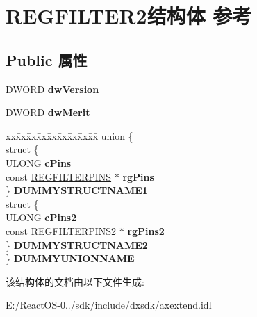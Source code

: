 \hypertarget{struct_r_e_g_f_i_l_t_e_r2}{}\section{R\+E\+G\+F\+I\+L\+T\+E\+R2结构体 参考}
\label{struct_r_e_g_f_i_l_t_e_r2}
\subsection*{Public 属性}
\begin{DoxyCompactItemize}
\item 
\mbox{\label{struct_r_e_g_f_i_l_t_e_r2_a279f8d8b2602a9630b11491e62f43051}} 
D\+W\+O\+RD {\bfseries dw\+Version}
\item 
\mbox{\label{struct_r_e_g_f_i_l_t_e_r2_aa1361e9e0f7e45c02ec86fc54f374249}} 
D\+W\+O\+RD {\bfseries dw\+Merit}
\item 
\mbox{\label{struct_r_e_g_f_i_l_t_e_r2_a09d29f7ca12ee5cbe849811550fce0ec}} 
\begin{tabbing}
xx\=xx\=xx\=xx\=xx\=xx\=xx\=xx\=xx\=\kill
union \{\\
\>struct \{\\
\>\>ULONG {\bfseries cPins}\\
\>\>const \hyperlink{struct_r_e_g_f_i_l_t_e_r_p_i_n_s}{REGFILTERPINS} $\ast$ {\bfseries rgPins}\\
\>\} {\bfseries DUMMYSTRUCTNAME1}\\
\>struct \{\\
\>\>ULONG {\bfseries cPins2}\\
\>\>const \hyperlink{struct_r_e_g_f_i_l_t_e_r_p_i_n_s2}{REGFILTERPINS2} $\ast$ {\bfseries rgPins2}\\
\>\} {\bfseries DUMMYSTRUCTNAME2}\\
\} {\bfseries DUMMYUNIONNAME}\\

\end{tabbing}\end{DoxyCompactItemize}


该结构体的文档由以下文件生成\+:\begin{DoxyCompactItemize}
\item 
E\+:/\+React\+O\+S-\/0../sdk/include/dxsdk/axextend.\+idl\end{DoxyCompactItemize}
